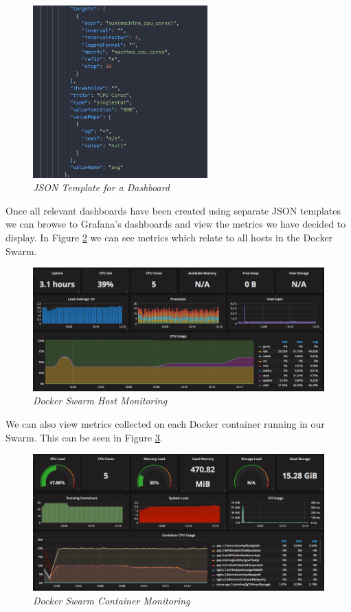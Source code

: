 \begin{figure}[!h]
\centering
\includegraphics*[width=0.6\textwidth]{components/images/json-template}
\caption{\em JSON Template for a Dashboard}
\label{fig:json-template}
\end{figure}

Once all relevant dashboards have been created using separate JSON templates we can browse to Grafana's dashboards and view the metrics we have decided to display. In Figure \ref{fig:docker-host} we can see metrics which relate to all hosts in the Docker Swarm.

\begin{figure}[!h]
\centering
\includegraphics*[width=\textwidth]{components/images/docker-host}
\caption{\em Docker Swarm Host Monitoring}
\label{fig:docker-host}
\end{figure}

We can also view metrics collected on each Docker container running in our Swarm. This can be seen in Figure \ref{fig:docker-containers}.
\newpage
\begin{figure}[!h]
\centering
\includegraphics*[width=\textwidth]{components/images/docker-containers}
\caption{\em Docker Swarm Container Monitoring}
\label{fig:docker-containers}
\end{figure}

